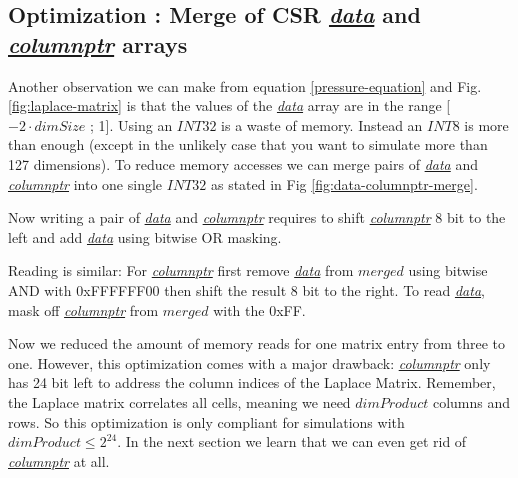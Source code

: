 \subsection{Optimization : Merge of CSR \hyperref[csr-data]{\textit{data}} and \hyperref[csr-columnptr]{\textit{columnptr}} arrays}
Another observation we can make from equation \ref{pressure-equation} and Fig. \ref{fig:laplace-matrix} is that the values of the \hyperref[csr-data]{\textit{data}} array are in the range [$-2 \cdot dimSize$ ; 1]. Using an $INT32$ is a waste of memory. Instead an $INT8$ is more than enough (except in the unlikely case that you want to simulate more than 127 dimensions). To reduce memory accesses we can merge pairs of \hyperref[csr-data]{\textit{data}} and \hyperref[csr-columnptr]{\textit{columnptr}} into one single $INT32$ as stated in Fig \ref{fig:data-columnptr-merge}. 
\par Now writing a pair of \hyperref[csr-data]{\textit{data}} and \hyperref[csr-columnptr]{\textit{columnptr}} requires to shift \hyperref[csr-columnptr]{\textit{columnptr}} 8 bit to the left and add  \hyperref[csr-data]{\textit{data}} using bitwise OR masking.
\par Reading is similar: For \hyperref[csr-columnptr]{\textit{columnptr}} first remove \hyperref[csr-data]{\textit{data}} from $merged$ using bitwise AND with 0xFFFFFF00 then shift the result 8 bit to the right. To read \hyperref[csr-data]{\textit{data}}, mask off \hyperref[csr-columnptr]{\textit{columnptr}} from $merged$ with the 0xFF.
\par Now we reduced the amount of memory reads for one matrix entry from three to one. However, this optimization comes with a major drawback: \hyperref[csr-columnptr]{\textit{columnptr}} only has 24 bit left to address the column indices of the Laplace Matrix. Remember, the Laplace matrix correlates all cells, meaning we need $dimProduct$ columns and rows. So this optimization is only compliant for simulations with $dimProduct \leq 2^{24}$. In the next section we learn that we can even get rid of \hyperref[csr-columnptr]{\textit{columnptr}} at all.
\newpage
